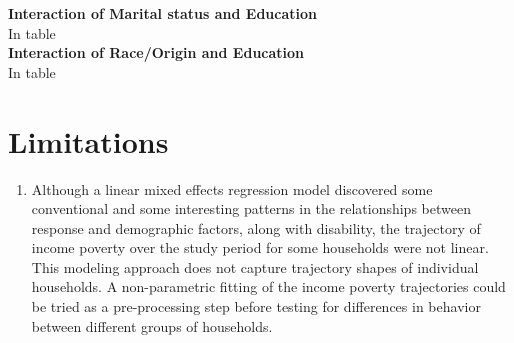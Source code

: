 \documentclass[11pt]{extarticle} %
\begin{document}
\noindent
{\bf{Interaction of Marital status and Education}} \\
In table \\

\noindent
{\bf{Interaction of Race/Origin and Education}} \\
In table \\

\section{Limitations}
\begin{enumerate}
\item Although a linear mixed effects regression model discovered some conventional and some interesting patterns in the relationships between response and demographic factors, along with disability, the trajectory of income poverty over the study period for some households were not linear. This modeling approach does not capture trajectory shapes of individual households. A non-parametric fitting of the income poverty trajectories could be tried as a pre-processing step before testing for differences in behavior between different groups of households. 
\end{enumerate}

\newpage




\newpage

\end{document}
